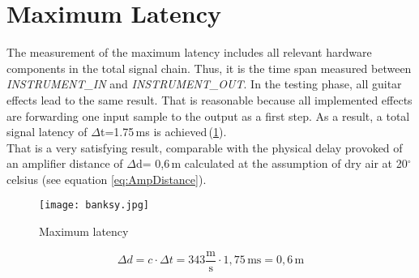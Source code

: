 \section{Maximum Latency}
The measurement of the maximum latency includes all relevant hardware components in the total signal chain. Thus, it is the time span measured between \textit{INSTRUMENT\_IN} and  \textit{INSTRUMENT\_OUT}. In the testing phase, all guitar effects lead to the same result. That is reasonable because all implemented effects are forwarding one input sample to the output as a first step. As a result, a total signal latency of $\Delta$t=1.75\,ms is achieved\,(\ref{fig:latency}).\\
That is a very satisfying result, comparable with the physical delay provoked of an amplifier distance of $\Delta$d= 0,6\,m calculated at the assumption of dry air at 20$^{\circ}$\,celsius (see equation \ref{eq:AmpDistance}). 


\begin{figure}[H]
	\centering \texttt{[image: banksy.jpg]}
	\caption[Menu]{Maximum latency}
	\label{fig:latency}
\end{figure}

\begin{equation}
\Delta d = c \cdot \Delta t = 343 \frac{\mathrm{m}}{\mathrm{s}} \cdot 1,75\,\mathrm{ms} = 0,6\,\mathrm{m}
\label{eq:AmpDistance}
\end{equation}

